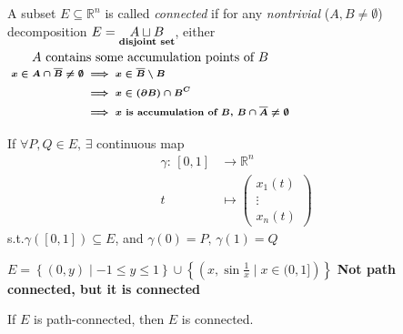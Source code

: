 \begin{definition}[Connectivity]
    A subset $E\subseteq \mathbb{R}^n$ is called \emph{connected} if for any \emph{nontrivial} ($A,B\neq\emptyset$) decomposition $E=\underset{\text{\textbf{disjoint set}}}{A\sqcup B}$, either $\underset{\text{ \textbf{\boldmath $
                        \begin{aligned}x\in A\cap\overline{B}\neq\emptyset & \implies x\in\overline{B}\setminus B                                    \\
                                                   & \implies x\in(\partial B)\cap B^C                                       \\
                                                   & \implies x\text{ is accumulation of }B,\,B\cap\overline{A}\neq\emptyset
                        \end{aligned}$} }
        }{A\text{ contains some accumulation points of }B}$
\end{definition}

\begin{definition}
    If $\forall P,Q\in E,\,\exists$ continuous map
    $$\begin{aligned}
            \gamma:\,[0,1] & \to \mathbb{R}^n      \\
            t              & \mapsto\begin{pmatrix}
                                        x_1(t) \\
                                        \vdots \\
                                        x_n(t)
                                    \end{pmatrix}
        \end{aligned}$$
    s.t.$\gamma\left([0,1]\right)\subseteq E$, and $\gamma(0)=P,\,\gamma(1)=Q$
\end{definition}

\begin{example}
    $E=\left\{(0,y)\mid -1\leq y\leq 1\right\}\cup\left\{\left(x,\sin\frac{1}{x}\mid x\in(0,1]\right)\right\}$ \textbf{Not path connected, but it is connected}
\end{example}

\begin{theorem}
    If $E$ is path-connected, then $E$ is connected.
\end{theorem}

